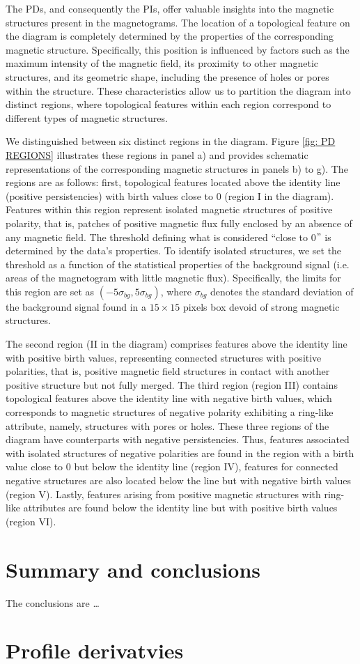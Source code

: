 \documentclass[12pt]{mythesis}
\begin{document}
The PDs, and consequently the PIs, offer valuable insights into the magnetic structures present in the magnetograms. The location of a topological feature on the diagram is completely determined by the properties of the corresponding magnetic structure. Specifically, this position is influenced by factors such as the maximum intensity of the magnetic field, its proximity to other magnetic structures, and its geometric shape, including the presence of holes or pores within the structure. These characteristics allow us to partition the diagram into distinct regions, where topological features within each region correspond to different types of magnetic structures.


We distinguished between six distinct regions in the diagram. Figure \ref{fig: PD REGIONS} illustrates these regions in panel a) and provides schematic representations of the corresponding magnetic structures in panels b) to g). The regions are as follows: first, topological features located above the identity line (positive persistencies) with birth values close to 0 (region I in the diagram). Features within this region represent isolated magnetic structures of positive polarity, that is, patches of positive magnetic flux fully enclosed by an absence of any magnetic field. The threshold defining what is considered ``close to 0$"$ is determined by the data's properties. To identify isolated structures, we set the threshold as a function of the statistical properties of the background signal (i.e. areas of the magnetogram with little magnetic flux). Specifically, the limits for this region are set as $(-5 \sigma _ {bg}, 5 \sigma _ {bg})$, where $\sigma _ {bg}$ denotes the standard deviation of the background signal found in a $15\times 15$ pixels box devoid of strong magnetic structures.

The second region (II in the diagram) comprises features above the identity line with positive birth values, representing connected structures with positive polarities, that is, positive magnetic field structures in contact with another positive structure but not fully merged. The third region (region III) contains topological features above the identity line with negative birth values, which corresponds to magnetic structures of negative polarity exhibiting a ring-like attribute, namely, structures with pores or holes. These three regions of the diagram have counterparts with negative persistencies. Thus, features associated with isolated structures of negative polarities are found in the region with a birth value close to 0 but below the identity line (region IV), features for connected negative structures are also located below the line but with negative birth values (region V). Lastly, features arising from positive magnetic structures with ring-like attributes are found below the identity line but with positive birth values (region VI).


\chapter{Summary and conclusions}

The conclusions are \dots

\appendix

\chapter{Profile derivatvies}

\citep{hale}


\cleardoublepage
\layout
\end{document}

